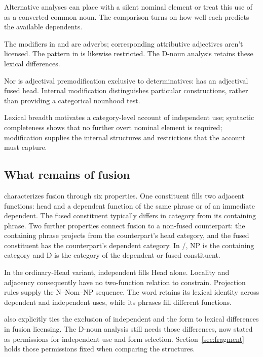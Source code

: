 \documentclass[12pt]{article}
\begin{document}
Alternative analyses can place  with a silent nominal element or treat this use of  as a converted common noun. The comparison turns on how well each predicts the available dependents.

The modifiers in  and  are adverbs; corresponding attributive adjectives aren't licensed. The pattern in  is likewise restricted. The D-noun analysis retains these lexical differences.

Nor is adjectival premodification exclusive to determinatives:  has an adjectival fused head. Internal modification distinguishes particular constructions, rather than providing a categorical nounhood test.

Lexical breadth motivates a category-level account of independent use; syntactic completeness shows that no further overt nominal element is required; modification supplies the internal structures and restrictions that the account must capture.

\subsection{What remains of fusion}

\textcite{Payne2007} characterizes fusion through six properties. One constituent fills two adjacent functions: head and a dependent function of the same phrase or of an immediate dependent. The fused constituent typically differs in category from its containing phrase. Two further properties connect fusion to a non-fused counterpart: the containing phrase projects from the counterpart's head category, and the fused constituent has the counterpart's dependent category. In /, NP is the containing category and D is the category of the dependent or fused constituent.

In the ordinary-Head variant, independent  fills Head alone. Locality and adjacency consequently have no two-function relation to constrain. Projection rules supply the N--Nom--NP sequence. The word  retains its lexical identity across dependent and independent uses, while its phrases fill different functions.

\textcite{Payne2007} also explicitly ties the exclusion of independent  and the form  to lexical differences in fusion licensing. The D-noun analysis still needs those differences, now stated as permissions for independent use and form selection. Section~\ref{sec:fragment} holds those permissions fixed when comparing the structures.
\end{document}
